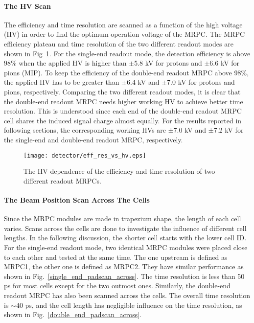 \paragraph{The HV Scan}
The efficiency and time resolution are scanned as a function of the high voltage (HV) in order to find the optimum operation voltage of the MRPC. The MRPC efficiency plateau and time resolution of the two different readout modes are shown in Fig~\ref{eff_res}. For the single-end readout mode, the detection efficiency is above 98\% when the applied HV is higher than $\pm$5.8 kV for protons and $\pm$6.6 kV for pions (MIP). To keep the efficiency of the double-end readout MRPC above 98\%, the applied HV has to be greater than $\pm$6.4 kV and $\pm$7.0 kV for protons and pions, respectively. Comparing the two different readout modes, it is clear that the double-end readout MRPC needs higher working HV to achieve better time resolution. This is understood since each end of the double-end readout MRPC cell shares the induced signal charge almost equally. For the results reported in following sections, the corresponding working HVs are ±7.0 kV and ±7.2 kV for the single-end and double-end readout MRPC, respectively.

\begin{figure}[htbp]
\begin{center}
\texttt{[image: detector/eff\_res\_vs\_hv.eps]}
\vspace*{-3mm}
\caption{The HV dependence of the efficiency and time resolution of two different readout MRPCs.} \label{eff_res}
\end{center}
\end{figure}

\paragraph{The Beam Position Scan Across The Cells}
Since the MRPC modules are made in trapezium shape, the length of each cell varies. Scans across the cells are done to investigate the influence of different cell lengths. In the following discussion, the shorter cell starts with the lower cell ID.
For the single-end readout mode, two identical MRPC modules were placed close to each other and tested at the same time. The one upstream is defined as MRPC1, the other one is defined as MRPC2. They have similar performance as shown in Fig.~\ref{single_end_padscan_across}. The time resolution is less than 50 ps for most cells except for the two outmost ones. Similarly, the double-end readout MRPC has also been scanned across the cells. The overall time resolution is $\sim$40 ps, and the cell length has negligible influence on the time resolution, as shown in Fig.~\ref{double_end_padscan_across}.

